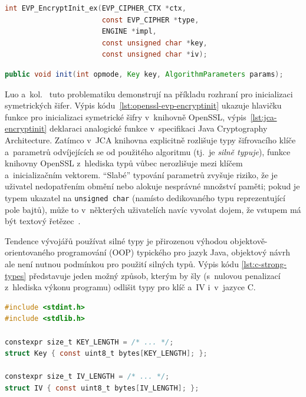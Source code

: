 \begin{lstlisting}[caption={[~Rozhraní funkce pro inicializaci šifry v~knihovně OpenSSL]~Rozhraní funkce pro inicializaci šifry v~knihovně OpenSSL \cite{openssl-evp-encryptinit}},label={lst:openssl-evp-encryptinit},float,language=C]
int EVP_EncryptInit_ex(EVP_CIPHER_CTX *ctx,
                       const EVP_CIPHER *type,
                       ENGINE *impl,
                       const unsigned char *key,
                       const unsigned char *iv);
\end{lstlisting}

\begin{lstlisting}[caption={[~Rozhraní funkce pro inicializaci šifry v~Java Cryptography Architecture]~Rozhraní funkce pro inicializaci šifry v~Java Cryptography Architecture \cite{jca-encryptinit}},label={lst:jca-encryptinit},float,language=Java]
public void init(int opmode, Key key, AlgorithmParameters params);
\end{lstlisting}

Luo a~kol.~\cite{comparative2023} tuto problematiku demonstrují na příkladu rozhraní pro inicializaci symetrických šifer. Výpis kódu~\ref{lst:openssl-evp-encryptinit} ukazuje hlavičku funkce pro inicializaci symetrické šifry v~knihovně OpenSSL, výpis~\ref{lst:jca-encryptinit} deklaraci analogické funkce v~specifikaci Java Cryptography Architecture. Zatímco v~JCA knihovna explicitně rozlišuje typy šifrovacího klíče a~parametrů odvíjejících se od použitého algoritmu (tj.~je \emph{silně typuje}), funkce knihovny OpenSSL z~hlediska typů vůbec nerozlišuje mezi klíčem a~inicializačním vektorem. ``Slabé'' typování parametrů zvyšuje riziko, že je uživatel nedopatřením obmění nebo alokuje nesprávné množství paměti; pokud je typem ukazatel na \texttt{unsigned char} (namísto dedikovaného typu reprezentující pole bajtů), může to v~některých uživatelích navíc vyvolat dojem, že vstupem má být textový řetězec~\cite{comparative2023}.

Tendence vývojářů používat silné typy je přirozenou výhodou objektově-orientovaného programování (OOP) typického pro jazyk Java, objektový návrh ale není nutnou podmínkou pro použití silných typů. Výpis kódu \ref{lst:c-strong-types} představuje jeden možný způsob, kterým by šly (s~nulovou penalizací z~hlediska výkonu programu) odlišit typy pro klíč a~IV i~v~jazyce C.

\begin{lstlisting}[caption={~Možná implementace silných typů pro klíč a~IV v~jazyce C},label={lst:c-strong-types},float,language=C]
#include <stdint.h>
#include <stdlib.h>

constexpr size_t KEY_LENGTH = /* ... */;
struct Key { const uint8_t bytes[KEY_LENGTH]; };

constexpr size_t IV_LENGTH = /* ... */;
struct IV { const uint8_t bytes[IV_LENGTH]; };
\end{lstlisting}

